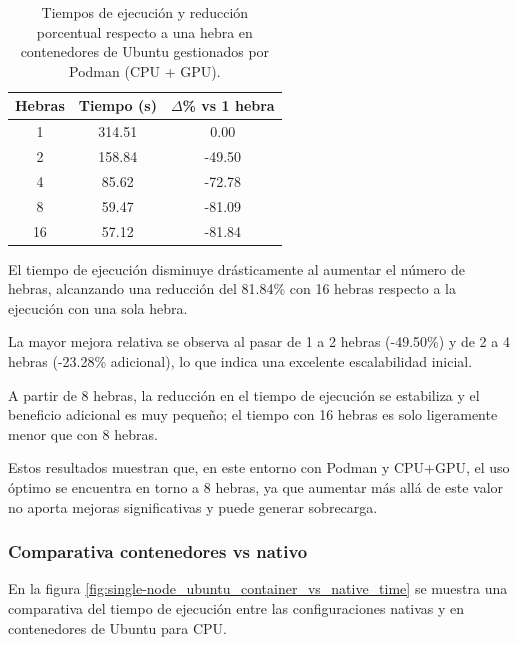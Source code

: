 \begin{table}[ht]
    \centering
    \begin{tabular}{|c|c|c|}
        \hline
        \textbf{Hebras} & \textbf{Tiempo (s)} & \textbf{$\Delta$\% vs 1 hebra} \\
        \hline
        1               & 314.51              & 0.00                           \\
        2               & 158.84              & -49.50                         \\
        4               & 85.62               & -72.78                         \\
        8               & 59.47               & -81.09                         \\
        16              & 57.12               & -81.84                         \\
        \hline
    \end{tabular}
    \caption{Tiempos de ejecución y reducción porcentual respecto a una hebra en contenedores de Ubuntu gestionados por Podman (CPU + GPU).}
    \label{tab:single-node_ubuntu_podman_gpu}
\end{table}

El tiempo de ejecución disminuye drásticamente al aumentar el número de hebras, alcanzando una reducción del 81.84\% con 16 hebras respecto a la ejecución con una sola hebra.

La mayor mejora relativa se observa al pasar de 1 a 2 hebras (-49.50\%) y de 2 a 4 hebras (-23.28\% adicional), lo que indica una excelente escalabilidad inicial.

A partir de 8 hebras, la reducción en el tiempo de ejecución se estabiliza y el beneficio adicional es muy pequeño; el tiempo con 16 hebras es solo ligeramente menor que con 8 hebras.

Estos resultados muestran que, en este entorno con Podman y CPU+GPU, el uso óptimo se encuentra en torno a 8 hebras, ya que aumentar más allá de este valor no aporta mejoras significativas y puede generar sobrecarga.

\subsubsection{Comparativa contenedores vs nativo}

En la figura \ref{fig:single-node_ubuntu_container_vs_native_time} se muestra una comparativa del tiempo de ejecución entre las configuraciones nativas y en contenedores de Ubuntu para CPU.

